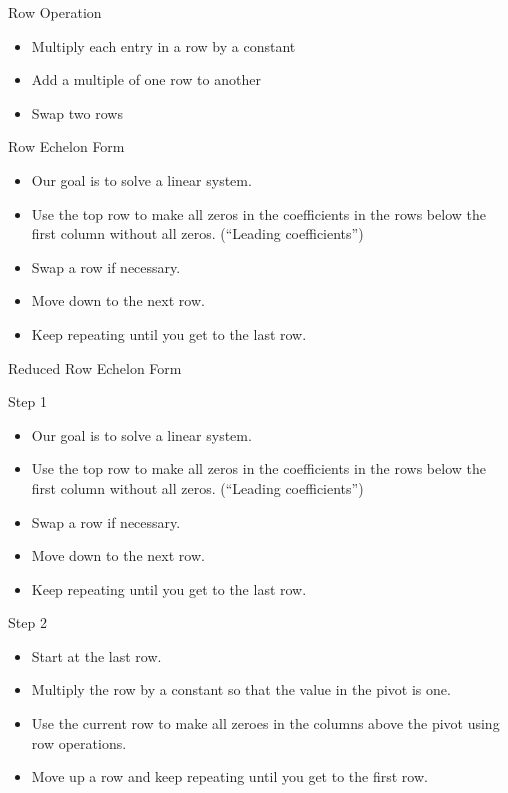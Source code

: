 \documentclass[svgnames,table,aspectratio=169]{beamer}
\begin{document}
\begin{frame}{Row Operation}

  \begin{itemize}
  \item Multiply each entry in a row by a constant
  \item Add a multiple of one row to another
  \item Swap two rows
  \end{itemize}
  
\end{frame}

\begin{frame}{Row Echelon Form}

  \begin{itemize}
  \item Our goal is to solve a linear system.
  \item Use the top row to make all zeros in the coefficients in the
    rows below the first column without all zeros. (``Leading
    coefficients'')
  \item Swap a row if necessary.
  \item Move down to the next row.
  \item Keep repeating until you get to the last row.
  \end{itemize}

\end{frame}

\begin{frame}{Reduced Row Echelon Form}

  Step 1
  \begin{itemize}
  \item Our goal is to solve a linear system.
  \item Use the top row to make all zeros in the coefficients in the
    rows below the first column without all zeros. (``Leading
    coefficients'')
  \item Swap a row if necessary.
  \item Move down to the next row.
  \item Keep repeating until you get to the last row.
  \end{itemize}

  Step 2
  \begin{itemize}
  \item Start at the last row.
  \item Multiply the row by a constant so that the value in the pivot
    is one.
  \item Use the current row to make all zeroes in the columns above
    the pivot using row operations.
  \item Move up a row and keep repeating until you get to the first
    row.
  \end{itemize}

  
\end{frame}
\end{document}
